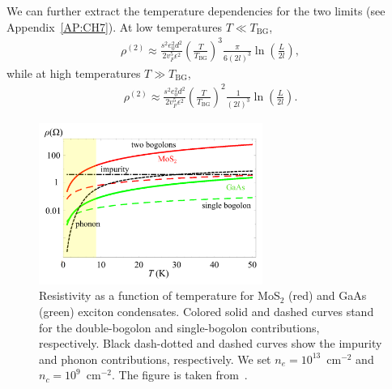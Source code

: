 We can further extract the temperature dependencies for the two limits (see Appendix~\ref{AP:CH7}).
At low temperatures $T\ll T_\textrm{BG}$,
%
\begin{eqnarray}
\label{CH7_rho2b}
\rho^{(2)}\approx\frac{s^2e_0^2d^2}{2v_F^5\epsilon^2}\left(\frac{T}{T_\textrm{BG}}\right)^3\frac{\pi}{6(2l)^3}\ln \left(\frac{L}{2l}\right),
\end{eqnarray}
%
while at high temperatures $T\gg T_\textrm{BG}$,
%
\begin{eqnarray}
\label{CH7_highT}
\rho^{(2)}\approx\frac{s^2e_0^2d^2}{2v_F^5\epsilon^2}\left(\frac{T}{T_\textrm{BG}}\right)^2\frac{1}{(2l)^3}\ln \left(\frac{L}{2l}\right).
\end{eqnarray}
%
%
%

%
%
%
\begin{figure}[ht]
\centering
\includegraphics[width=0.65\textwidth]{Fig/Ch6/Fig1ER.pdf}
\caption[Temperature-dependent resistivity of $\textrm{MoS}_2$ and GaAs]{Resistivity as a function of temperature for MoS$_2$ (red) and GaAs (green) exciton condensates.
Colored solid and dashed curves stand for the double-bogolon and single-bogolon contributions, respectively.
Black dash-dotted and dashed curves show the impurity and phonon contributions, respectively. We set $n_e=10^{13}$~cm$^{-2}$ and $n_c=10^9$~cm$^{-2}$. The figure is taken from~\cite{Villegas:2019aa}.}
\label{CH7_Fig3}
\end{figure}
%
%
%

%
%
